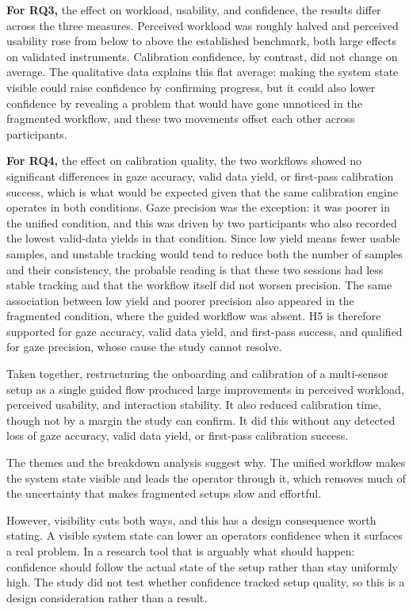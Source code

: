 \documentclass[
]{article}
\begin{document}
\textbf{For RQ3,} the effect on workload, usability, and confidence, the results differ across the three measures. Perceived workload was roughly halved and perceived usability rose from below to above the established benchmark, both large effects on validated instruments. Calibration confidence, by contrast, did not change on average. The qualitative data explains this flat average: making the system state visible could raise confidence by confirming progress, but it could also lower confidence by revealing a problem that would have gone unnoticed in the fragmented workflow, and these two movements offset each other across participants.

\textbf{For RQ4,} the effect on calibration quality, the two workflows showed no significant differences in gaze accuracy, valid data yield, or first-pass calibration success, which is what would be expected given that the same calibration engine operates in both conditions. Gaze precision was the exception: it was poorer in the unified condition, and this was driven by two participants who also recorded the lowest valid-data yields in that condition. Since low yield means fewer usable samples, and unstable tracking would tend to reduce both the number of samples and their consistency, the probable reading is that these two sessions had less stable tracking and that the workflow itself did not worsen precision. The same association between low yield and poorer precision also appeared in the fragmented condition, where the guided workflow was absent. H5 is therefore supported for gaze accuracy, valid data yield, and first-pass success, and qualified for gaze precision, whose cause the study cannot resolve.

Taken together, restructuring the onboarding and calibration of a multi-sensor setup as a single guided flow produced large improvements in perceived workload, perceived usability, and interaction stability. It also reduced calibration time, though not by a margin the study can confirm. It did this without any detected loss of gaze accuracy, valid data yield, or first-pass calibration success.

The themes and the breakdown analysis suggest why. The unified workflow makes the system state visible and leads the operator through it, which removes much of the uncertainty that makes fragmented setups slow and effortful.

However, visibility cuts both ways, and this has a design consequence worth stating. A visible system state can lower an operator\textquotesingle s confidence when it surfaces a real problem. In a research tool that is arguably what should happen: confidence should follow the actual state of the setup rather than stay uniformly high. The study did not test whether confidence tracked setup quality, so this is a design consideration rather than a result.
\end{document}
